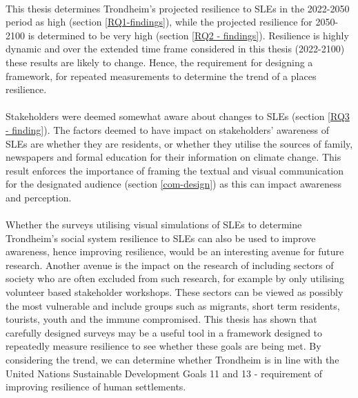 \paragraph{}
This thesis determines Trondheim's projected resilience to SLEs in the 2022-2050 period as high (section \ref{RQ1-findings}), while the projected resilience for 2050-2100 is determined to be very high (section \ref{RQ2 - findings}). Resilience is highly dynamic and over the extended time frame considered in this thesis (2022-2100) these results are likely to change. Hence, the requirement for designing a framework, for repeated measurements to determine the trend of a places resilience.

\paragraph{}
Stakeholders were deemed somewhat aware about changes to SLEs (section \ref{RQ3 - finding}). The factors deemed to have impact on stakeholders' awareness of SLEs are whether they are residents, or whether they utilise the sources of family, newspapers and formal education for their information on climate change. This result enforces the importance of framing the textual and visual communication for the designated audience (section \ref{com-design}) as this can impact awareness and perception.  
\paragraph{}


Whether the surveys utilising visual simulations of SLEs to determine Trondheim's social system resilience to SLEs can also be used to improve awareness, hence improving resilience, would be an interesting avenue for future research. Another avenue is the impact on the research of including sectors of society who are often excluded from such research, for example by only utilising volunteer based stakeholder workshops. These sectors can be viewed as possibly the most vulnerable and include groups such as migrants, short term residents, tourists, youth and the immune compromised. This thesis has shown that carefully designed surveys may be a useful tool in a framework designed to repeatedly measure resilience to see whether these goals are being met. By considering the trend, we can determine whether Trondheim is in line with the United Nations Sustainable Development Goals 11 and 13 - requirement of improving resilience of human settlements.





